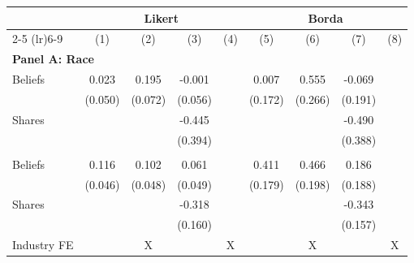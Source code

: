 \begin{tabular}{lcccccccc}
\toprule
 & \multicolumn{4}{c}{Likert} & \multicolumn{4}{c}{Borda} \\
\cmidrule(lr){2-5} \cmidrule(lr){6-9}
 & (1) & (2) & (3) & (4) & (5) & (6) & (7) & (8)
\\
\midrule
\multicolumn{9}{l}{\textbf{Panel A: Race}} \\
Beliefs & 0.023 & 0.195 & -0.001 &  & 0.007 & 0.555 & -0.069 & 
\\
 & (0.050) & (0.072) & (0.056) &  & (0.172) & (0.266) & (0.191) & 
\\
Shares &  &  & -0.445 &  &  &  & -0.490 & 
\\
 &  &  & (0.394) &  &  &  & (0.388) & 
\\
\addlinespace
\multicolumn{9}{l}{\textbf{Panel B: Gender}} \\
Beliefs & 0.116 & 0.102 & 0.061 &  & 0.411 & 0.466 & 0.186 & 
\\
 & (0.046) & (0.048) & (0.049) &  & (0.179) & (0.198) & (0.188) & 
\\
Shares &  &  & -0.318 &  &  &  & -0.343 & 
\\
 &  &  & (0.160) &  &  &  & (0.157) & 
\\
\addlinespace
Industry FE &  & X &  & X &  & X &  & X
\\
\bottomrule
\end{tabular}

